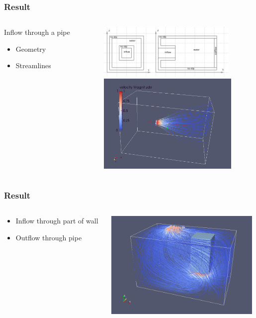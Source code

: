 \documentclass{beamer}
\begin{document}
\begin{frame}
\frametitle{Result}
\begin{columns}
\begin{column}{0.35\textwidth}
Inflow through a pipe
\begin{itemize}
\item Geometry
\item Streamlines
\end{itemize}
\end{column}
\begin{column}{0.65\textwidth}
\flushright
\includegraphics[height=2.6cm]{pipeinflow.png}\\
\includegraphics[height=4.8cm]{pipeinflw.png}
\end{column}
\end{columns}
\end{frame}

\begin{frame}
\frametitle{Result}
\begin{columns}
\begin{column}{0.30\textwidth}
\begin{itemize}
\item Inflow through part of wall
\item Outflow through pipe
\end{itemize}

\end{column}
\begin{column}{0.70\textwidth}
\includegraphics[height=5.2cm]{Pipe.png}
\end{column}
\end{columns}
\end{frame}
\end{document}
